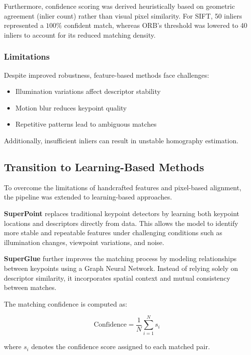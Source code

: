 \documentclass[conference]{IEEEtran}
\begin{document}
Furthermore, confidence scoring was derived heuristically based on geometric agreement (inlier count) rather than visual pixel similarity. For SIFT, 50 inliers represented a $100\%$ confident match, whereas ORB's threshold was lowered to 40 inliers to account for its reduced matching density.

\subsubsection{Limitations}

Despite improved robustness, feature-based methods face challenges:

\begin{itemize}[noitemsep]
    \item Illumination variations affect descriptor stability
    \item Motion blur reduces keypoint quality
    \item Repetitive patterns lead to ambiguous matches
\end{itemize}

Additionally, insufficient inliers can result in unstable homography estimation.



\subsection{Transition to Learning-Based Methods}

To overcome the limitations of handcrafted features and pixel-based alignment, the pipeline was extended to learning-based approaches.

\textbf{SuperPoint} \cite{detone2018superpoint} replaces traditional keypoint detectors by learning both keypoint locations and descriptors directly from data. This allows the model to identify more stable and repeatable features under challenging conditions such as illumination changes, viewpoint variations, and noise.

\textbf{SuperGlue} \cite{sarlin2020superglue} further improves the matching process by modeling relationships between keypoints using a Graph Neural Network. Instead of relying solely on descriptor similarity, it incorporates spatial context and mutual consistency between matches.

The matching confidence is computed as:

\[
\text{Confidence} = \frac{1}{N} \sum_{i=1}^{N} s_i
\]

where $s_i$ denotes the confidence score assigned to each matched pair.
\end{document}
